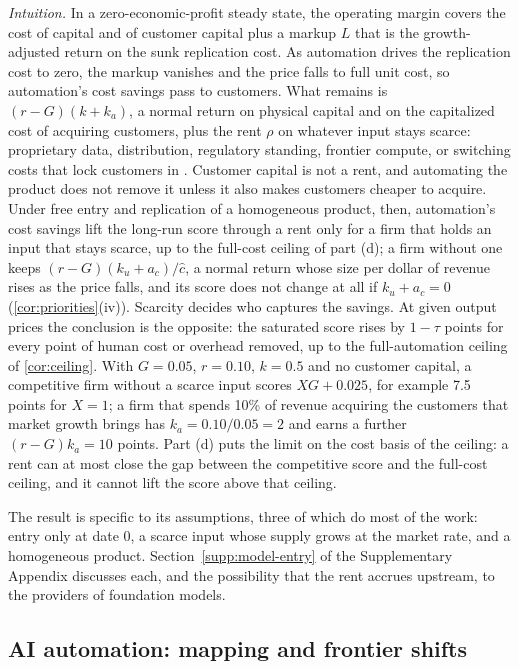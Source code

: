 \noindent\emph{Intuition.} In a zero-economic-profit steady state, the operating margin covers the cost of capital and of customer capital plus a markup $L$ that is the growth-adjusted return on the sunk replication cost. As automation drives the replication cost to zero, the markup vanishes and the price falls to full unit cost, so automation's cost savings pass to customers. What remains is $(r-G)(k+k_a)$, a normal return on physical capital and on the capitalized cost of acquiring customers, plus the rent $\rho$ on whatever input stays scarce: proprietary data, distribution, regulatory standing, frontier compute, or switching costs that lock customers in \citep{farrell2007coordination}. Customer capital is not a rent, and automating the product does not remove it unless it also makes customers cheaper to acquire. Under free entry and replication of a homogeneous product, then, automation's cost savings lift the long-run score through a rent only for a firm that holds an input that stays scarce, up to the full-cost ceiling of part (d); a firm without one keeps $(r-G)(k_u+a_c)/\hat c$, a normal return whose size per dollar of revenue rises as the price falls, and its score does not change at all if $k_u+a_c=0$ (\autoref{cor:priorities}(iv)). Scarcity decides who captures the savings. At given output prices the conclusion is the opposite: the saturated score rises by $1-\tau$ points for every point of human cost or overhead removed, up to the full-automation ceiling of \autoref{cor:ceiling}. With $G=0.05$, $r=0.10$, $k=0.5$ and no customer capital, a competitive firm without a scarce input scores $XG+0.025$, for example 7.5 points for $X=1$; a firm that spends 10\% of revenue acquiring the customers that market growth brings has $k_a=0.10/0.05=2$ and earns a further $(r-G)k_a=10$ points. Part (d) puts the limit on the cost basis of the ceiling: a rent can at most close the gap between the competitive score and the full-cost ceiling, and it cannot lift the score above that ceiling.

The result is specific to its assumptions, three of which do most of the work: entry only at date 0, a scarce input whose supply grows at the market rate, and a homogeneous product. Section~\ref{supp:model-entry} of the Supplementary Appendix discusses each, and the possibility that the rent accrues upstream, to the providers of foundation models.

\subsection{AI automation: mapping and frontier shifts}\label{sec:model-ai}

